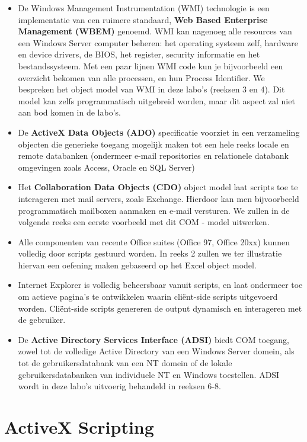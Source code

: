 \documentclass[11pt,a4paper]{report}
\begin{document}
\begin{itemize}
\item De Windows Management Instrumentation (WMI) technologie is een implementatie van een ruimere standaard, \textbf{Web Based Enterprise Management (WBEM)} genoemd. WMI kan nagenoeg alle resources van een Windows Server computer beheren: het operating systeem zelf, hardware en device drivers, de BIOS, het register, security informatie en het bestandssysteem. Met een paar lijnen WMI code kun je bijvoorbeeld een overzicht bekomen van alle processen, en hun Process Identifier. We bespreken het object model van WMI in deze labo's (reeksen 3 en 4). Dit model kan zelfs programmatisch uitgebreid worden, maar dit aspect zal niet aan bod komen in de labo's.
\item De \textbf{ActiveX Data Objects (ADO)} specificatie voorziet in een verzameling objecten die generieke toegang mogelijk maken tot een hele reeks locale en remote databanken (ondermeer e-mail repositories en relationele databank omgevingen zoals Access, Oracle en SQL Server)
\item Het \textbf{Collaboration Data Objects (CDO)} object model laat scripts toe te interageren met mail servers, zoals Exchange. Hierdoor kan men bijvoorbeeld programmatisch mailboxen aanmaken en e-mail versturen. We zullen in de volgende reeks een eerste voorbeeld met dit COM - model uitwerken.
\item Alle componenten van recente Office suites (Office 97, Office 20xx) kunnen volledig door scripts gestuurd worden. In reeks 2 zullen we ter illustratie hiervan een oefening maken gebaseerd op het Excel  object model.
\item Internet Explorer is volledig beheersbaar vanuit scripts, en laat ondermeer toe om actieve pagina's te ontwikkelen waarin cliënt-side scripts uitgevoerd worden. Cliënt-side scripts genereren de output dynamisch en interageren met de gebruiker.
\item De \textbf{Active Directory Services Interface (ADSI)} biedt COM toegang, zowel tot de volledige Active Directory van een Windows Server domein, als tot de gebruikersdatabank van een NT domein of de lokale gebruikersdatabanken van individuele NT en Windows toestellen. ADSI wordt in deze labo's uitvoerig behandeld in reeksen 6-8.
\end{itemize}

\section{ActiveX Scripting}
\end{document}
